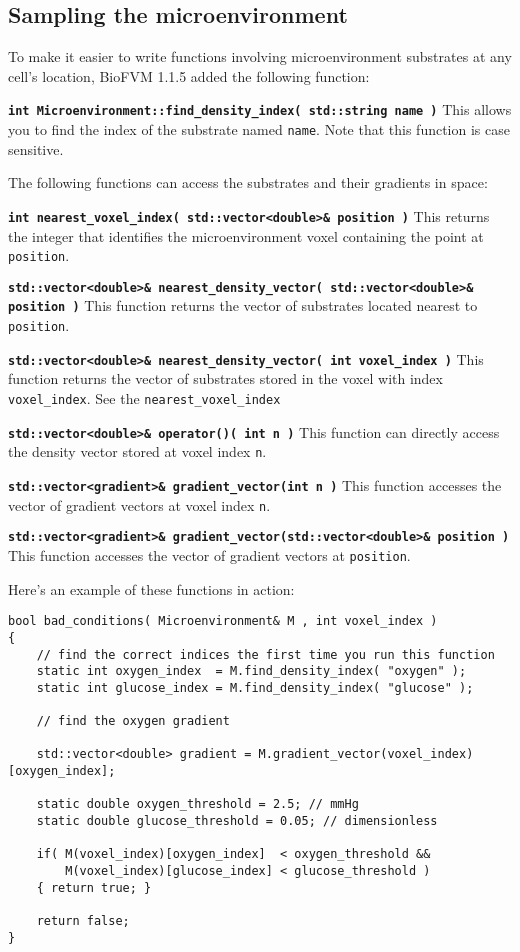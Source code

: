 \documentclass[12pt]{article}
\renewcommand{\v}{\verb}
\newcommand{\smallcode}[1]{\textbf{\texttt{#1}}}
\begin{document}
\subsection{Sampling the microenvironment}
\label{sec:sample_microenvironment}
To make it easier to write functions involving microenvironment substrates 
at any cell's location, BioFVM 1.1.5 added the following function: 

\smallcode{int Microenvironment::find\_density\_index( std::string name )}
This allows you to find the index of the substrate named \v|name|. Note that this 
function is case sensitive. 

The following functions can access the substrates and their gradients in
space: 

\smallcode{int nearest\_voxel\_index( std::vector<double>\& position )} This 
returns the integer that identifies the microenvironment voxel containing the 
point at \verb+position+. 

\smallcode{std::vector<double>\& nearest\_density\_vector( std::vector<double>\& position )} 
This function returns the vector of substrates located nearest to \verb+position+. 

\smallcode{std::vector<double>\& nearest\_density\_vector( int voxel\_index )} 
This function returns the vector of substrates stored in the voxel with index 
\verb+voxel_index+. See the \verb+nearest_voxel_index+ 

\smallcode{std::vector<double>\& operator()( int n )} This function 
can directly access the density vector stored at voxel index \verb+n+. 

\smallcode{std::vector<gradient>\& gradient\_vector(int n )} This function 
accesses the vector of gradient vectors at voxel index \verb+n+. 
	
\smallcode{std::vector<gradient>\& gradient\_vector(std::vector<double>\& position )}
This function accesses the vector of gradient vectors at \verb+position+.

Here's an example of these functions in action:

\begin{verbatim}
bool bad_conditions( Microenvironment& M , int voxel_index )
{
    // find the correct indices the first time you run this function
    static int oxygen_index  = M.find_density_index( "oxygen" ); 
    static int glucose_index = M.find_density_index( "glucose" ); 

    // find the oxygen gradient 
    
    std::vector<double> gradient = M.gradient_vector(voxel_index)[oxygen_index]; 

    static double oxygen_threshold = 2.5; // mmHg 
    static double glucose_threshold = 0.05; // dimensionless 
 
    if( M(voxel_index)[oxygen_index]  < oxygen_threshold && 
        M(voxel_index)[glucose_index] < glucose_threshold )
    { return true; }
    
    return false; 
}
\end{verbatim}
\end{document}
